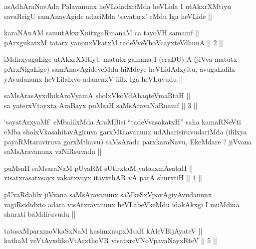 \begin{artha}
asAdhAraNavAda Palavanunx heVLidadxriMda heVLida I utAkxrXMtiyu
savaRrigU samAnavAgide adariMda `sayatarx' eMdu Iga heVLide ||
\end{artha}


\begin{shl}
karaNAnAM samutAkxrXnitxgaRmanaM ca tayoVH samamf || \\
pArxgukatxM tatarx yanonxVkatxM tadeVveVhoVcayxteV\s dhunA ||  2 ||  
\end{shl}

\begin{artha}
iMdirxyagaLige utAkxrXMtiyU matutx gamana I (eraDU) A (jiVva matutx
pArxNigaLige) samAnavAgideyeMdu hiMdeye heVLidAdxyitu, avugaLalilx
yAvudanunx heVLilalxvo adanenxV ililx Iga heVLuvudu ||
\end{artha}


\begin{shl}
saMsArasAyxdhikAroV\s yamA sholxVkoVdAhaqteVmaRtaH || \\
sa yaterxVtayxta AraBayx puMsaH saMsAravaNaRnamf ||  3 ||  
\end{shl}

\begin{artha}
`sayatArxyaMf' eMbalilxMda AraMBisi ``tadeVvasakatxH'' saha kamaRNeVti
  eMba sholxVkasahitavAgiruva garxMthavanunx udAharisiruvudariMda
  (ililxya payaRMtaraviruva garxMthavu) saMsArada parxkaraNavu,
  EkeMdare ? jiVvana saMsAravanunx vaNiRsuvadu ||
\end{artha}


\begin{shl}
puMsaH saMsaraNaM pUvaRM sUtirxtaM yatasxmAsataH || \\
visatxrasatxsayx vakatxvayx itayxthAR vA parA shurxtiH ||  4 ||  
\end{shl}

\begin{artha}
pUvaRdalilx jiVvana saMsAravanunx saMkeSxVpavAgiyAvudanunx
vagiRsididxto adara visAtxravanunx heVLabeVkeMdu idakAkxgi I muMdina
shurxti baMdiruvudu ||
\end{artha}

\begin{shl}
tatasxMparxmoVkaSxNaM kasimxnupxMsaH kAleV\s BijAyateV || \\
kathaM veVtAyxdikoV\s tArxthoVR visatxreVNoVpavaNayxRteV ||  5 ||  
\end{shl}

